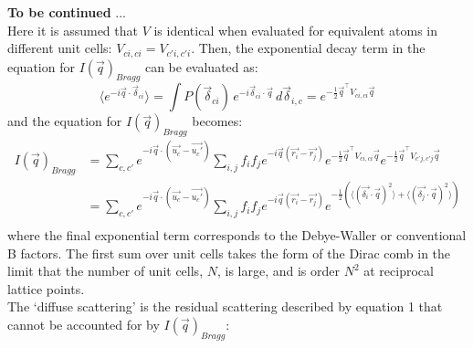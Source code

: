 \documentclass{article}
\begin{document}
\textbf{To be continued} ...\\

Here it is assumed that $V$ is identical when evaluated for equivalent atoms in different unit cells: $V_{ci,ci} = V_{c'i,c'i}$.
Then, the exponential decay term in the equation for $I(\vec{q})_{Bragg}$ can be evaluated as\footnotemark:
\begin{equation}
\langle e^{-i {\vec{q}} \cdot \vec{\delta}_{ci} } \rangle = \int P(\vec{\delta}_{ci})\, e^{-i \vec{\delta}_{ci} \cdot {\vec{q}}} \, d\vec{\delta}_{i,c} = e^{-\frac{1}{2} \vec{q}^\intercal V_{ci,ci} \vec{q} }
\end{equation}
and the equation for $I(\vec{q})_{Bragg}$ becomes:
\begin{equation}
\begin{aligned}
I(\vec{q})_{Bragg} & = \sum\limits_{c,c'} e^{-i \vec{q} \cdot (\vec{u_c} - \vec{u_c'})} \sum\limits_{i,j} f_i f_j e^{-i \vec{q} (\vec{r_i} - \vec{r_j})} e^{-\frac{1}{2} \vec{q}^\intercal V_{ci,ci} \vec{q}} e^{-\frac{1}{2} \vec{q}^\intercal V_{c'j,c'j} \vec{q}} \\
& = \sum\limits_{c,c'} e^{-i \vec{q} \cdot (\vec{u_c} - \vec{u_c'})} \sum\limits_{i,j} f_i f_j e^{-i \vec{q} (\vec{r_i} - \vec{r_j})} e^{-\frac{1}{2} (\langle (\vec{\delta_i} \cdot \vec{q})^2 \rangle + \langle (\vec{\delta_j} \cdot \vec{q})^2 \rangle) } \\
\end{aligned}
\end{equation}
where the final exponential term corresponds to the Debye-Waller or conventional B factors. The first sum over unit cells takes the form of the Dirac comb in the limit that the number of unit cells, $N$, is large, and is order $N^2$ at reciprocal lattice points. 
\newline
{}
\\
The `diffuse scattering' is the residual scattering described by equation 1 that cannot be accounted for by $I(\vec{q})_{Bragg}$:
\end{document}
